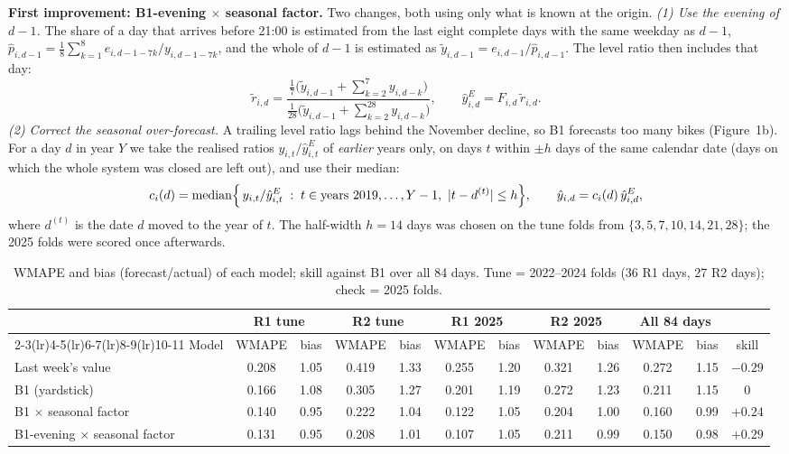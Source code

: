 \documentclass[10pt,a4paper]{article}
\begin{document}
\textbf{First improvement: B1-evening $\times$ seasonal factor.} Two changes, both using only
what is known at the origin.
\emph{(1) Use the evening of $d-1$.} The share of a day that arrives before 21:00 is estimated from
the last eight complete days with the same weekday as $d-1$,
$\hat p_{i,d-1}=\tfrac18\sum_{k=1}^{8} e_{i,d-1-7k}/y_{i,d-1-7k}$, and the whole of $d-1$ is
estimated as $\tilde y_{i,d-1}=e_{i,d-1}/\hat p_{i,d-1}$. The level ratio then includes that day:
\[
  \tilde r_{i,d} = \frac{\tfrac17\bigl(\tilde y_{i,d-1}+\sum_{k=2}^{7}y_{i,d-k}\bigr)}
                        {\tfrac1{28}\bigl(\tilde y_{i,d-1}+\sum_{k=2}^{28}y_{i,d-k}\bigr)},
  \qquad
  \hat y^{E}_{i,d} = F_{i,d}\,\tilde r_{i,d}.
\]
\emph{(2) Correct the seasonal over-forecast.} A trailing level ratio lags behind the November
decline, so B1 forecasts too many bikes (Figure~1b). For a day $d$ in year $Y$ we take the realised
ratios $y_{i,t}/\hat y^{E}_{i,t}$ of \emph{earlier} years only, on days $t$ within $\pm h$ days of the
same calendar date (days on which the whole system was closed are left out), and use their median:
\[
  c_i(d)=\operatorname*{median}\Bigl\{\,y_{i,t}/\hat y^{E}_{i,t}\;:\; t\in\text{years }2019,\dots,Y-1,\ \lvert t-d^{(t)}\rvert\le h\Bigr\},
  \qquad
  \hat y_{i,d}=c_i(d)\,\hat y^{E}_{i,d},
\]
where $d^{(t)}$ is the date $d$ moved to the year of $t$. The half-width $h=14$ days was chosen on
the tune folds from $\{3,5,7,10,14,21,28\}$; the 2025 folds were scored once afterwards.

\begin{table}[h]
\centering\small
\caption{WMAPE and bias (forecast/actual) of each model; skill against B1 over all 84 days.
Tune = 2022--2024 folds (36 R1 days, 27 R2 days); check = 2025 folds.}
\label{tab:res}
\setlength{\tabcolsep}{3.5pt}
\begin{tabular}{@{}l cc cc cc cc cc c@{}}
\toprule
 & \multicolumn{2}{c}{R1 tune} & \multicolumn{2}{c}{R2 tune} & \multicolumn{2}{c}{R1 2025} & \multicolumn{2}{c}{R2 2025} & \multicolumn{2}{c}{All 84 days} & \\
\cmidrule(lr){2-3}\cmidrule(lr){4-5}\cmidrule(lr){6-7}\cmidrule(lr){8-9}\cmidrule(lr){10-11}
Model & WMAPE & bias & WMAPE & bias & WMAPE & bias & WMAPE & bias & WMAPE & bias & skill \\
\midrule
Last week's value & 0.208 & 1.05 & 0.419 & 1.33 & 0.255 & 1.20 & 0.321 & 1.26 & 0.272 & 1.15 & $-0.29$ \\
B1 (yardstick) & 0.166 & 1.08 & 0.305 & 1.27 & 0.201 & 1.19 & 0.272 & 1.23 & 0.211 & 1.15 & 0 \\
B1 $\times$ seasonal factor & 0.140 & 0.95 & 0.222 & 1.04 & 0.122 & 1.05 & 0.204 & 1.00 & 0.160 & 0.99 & $+0.24$ \\
B1-evening $\times$ seasonal factor & 0.131 & 0.95 & 0.208 & 1.01 & 0.107 & 1.05 & 0.211 & 0.99 & 0.150 & 0.98 & $+0.29$ \\
\bottomrule
\end{tabular}
\end{table}
\end{document}

